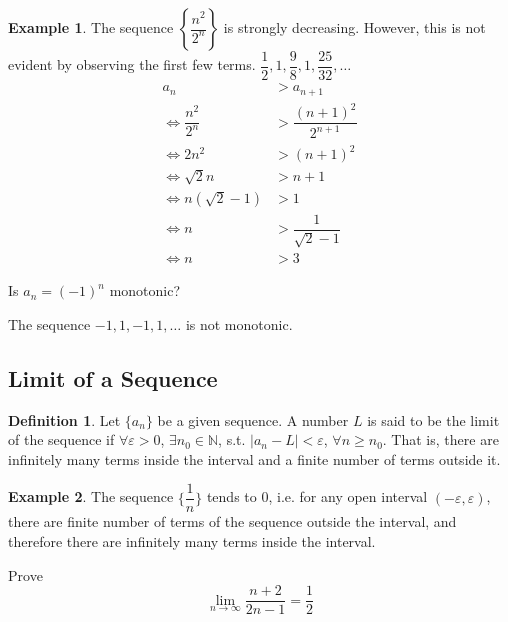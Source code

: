 \documentclass[fleqn, a4paper, 12pt, twoside]{article}
\theoremstyle{definition}
\newtheorem{example}{Example}
\newtheorem{definition}{Definition}
\theoremstyle{theorem}
\begin{document}
{\begin{example}
	The sequence $\left\{ \dfrac{n^2}{2^n} \right\}$ is strongly decreasing.
	However, this is not evident by observing the first few terms.
	$\dfrac{1}{2}, 1, \dfrac{9}{8}, 1, \dfrac{25}{32}, \dots$
	\begin{align*}
		a_n &> a_{n + 1}\\
		\iff \dfrac{n^2}{2^n} &> \dfrac{(n + 1)^2}{2^{n + 1}}\\
		\iff 2 n^2 &> (n + 1)^2\\
		\iff \sqrt{2} n &> n + 1\\
		\iff n(\sqrt{2} - 1) &> 1\\
		\iff n &> \dfrac{1}{\sqrt{2} - 1}\\
		\iff n &> 3
	\end{align*}
\end{example}

\begin{question}
	Is $a_n = (-1)^n$ monotonic?
\end{question}

\begin{solution}[print]
	The sequence $-1, 1, -1, 1, \dots$ is not monotonic.
\end{solution}

\subsection{Limit of a Sequence}

\begin{definition}
	Let $\{a_n\}$ be a given sequence.
	A number $L$ is said to be the limit of the sequence if $\forall \varepsilon > 0$, $\exists n_0 \in \mathbb{N}$, s.t. $|a_n - L| < \varepsilon$, $\forall n \geq n_0$.
	That is, there are infinitely many terms inside the interval and a finite number of terms outside it.
\end{definition}

\begin{example}
	The sequence $\{\dfrac{1}{n}\}$ tends to 0, i.e. for any open interval $(-\varepsilon, \varepsilon)$, there are finite number of terms of the sequence outside the interval, and therefore there are infinitely many terms inside the interval.
\end{example}

\begin{question}
	Prove
	\begin{equation*}
		\lim\limits_{n \to \infty} \dfrac{n + 2}{2n - 1} = \dfrac{1}{2}
	\end{equation*}
\end{question}

}
\end{document}
